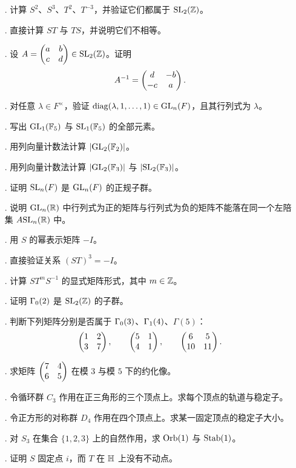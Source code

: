 \begin{enumerate}
  \item[\basic 1.] 计算 $S^2$、$S^3$、$T^2$、$T^{-3}$，并验证它们都属于 $\mathrm{SL}_2(\mathbb{Z})$。
  \item[\basic 2.] 直接计算 $ST$ 与 $TS$，并说明它们不相等。
  \item[\basic 3.] 设 $A=\begin{pmatrix} a&b\\ c&d \end{pmatrix}\in \mathrm{SL}_2(\mathbb{Z})$。证明
  \[
  A^{-1}=\begin{pmatrix} d&-b\\ -c&a \end{pmatrix}.
  \]
  \item[\basic 4.] 对任意 $\lambda\in F^\times$，验证 $\operatorname{diag}(\lambda,1,\dots,1)\in \mathrm{GL}_n(F)$，且其行列式为 $\lambda$。
  \item[\basic 5.] 写出 $\mathrm{GL}_1(\mathbb{F}_5)$ 与 $\mathrm{SL}_1(\mathbb{F}_5)$ 的全部元素。
  \item[\basic 6.] 用列向量计数法计算 $|\mathrm{GL}_2(\mathbb{F}_2)|$。
  \item[\basic 7.] 用列向量计数法计算 $|\mathrm{GL}_2(\mathbb{F}_3)|$ 与 $|\mathrm{SL}_2(\mathbb{F}_3)|$。
  \item[\basic 8.] 证明 $\mathrm{SL}_n(F)$ 是 $\mathrm{GL}_n(F)$ 的正规子群。
  \item[\basic 9.] 说明 $\mathrm{GL}_n(\mathbb{R})$ 中行列式为正的矩阵与行列式为负的矩阵不能落在同一个左陪集 $A\mathrm{SL}_n(\mathbb{R})$ 中。
  \item[\basic 10.] 用 $S$ 的幂表示矩阵 $-I$。
  \item[\basic 11.] 直接验证关系 $(ST)^3=-I$。
  \item[\basic 12.] 计算 $ST^mS^{-1}$ 的显式矩阵形式，其中 $m\in\mathbb{Z}$。
  \item[\basic 13.] 证明 $\Gamma_0(2)$ 是 $\mathrm{SL}_2(\mathbb{Z})$ 的子群。
  \item[\basic 14.] 判断下列矩阵分别是否属于 $\Gamma_0(3)$、$\Gamma_1(4)$、$\Gamma(5)$：
  \[
  \begin{pmatrix} 1&2\\ 3&7 \end{pmatrix},\qquad \begin{pmatrix} 5&1\\ 4&1 \end{pmatrix},\qquad \begin{pmatrix} 6&5\\ 10&11 \end{pmatrix}.
  \]
  \item[\basic 15.] 求矩阵 $\begin{pmatrix} 7&4\\ 6&5 \end{pmatrix}$ 在模 $3$ 与模 $5$ 下的约化像。
  \item[\basic 16.] 令循环群 $C_3$ 作用在正三角形的三个顶点上。求每个顶点的轨道与稳定子。
  \item[\basic 17.] 令正方形的对称群 $D_4$ 作用在四个顶点上。求某一固定顶点的稳定子大小。
  \item[\basic 18.] 对 $S_3$ 在集合 $\{1,2,3\}$ 上的自然作用，求 $\operatorname{Orb}(1)$ 与 $\operatorname{Stab}(1)$。
  \item[\basic 19.] 证明 $S$ 固定点 $i$，而 $T$ 在 $\mathbb{H}$ 上没有不动点。

\end{enumerate}
